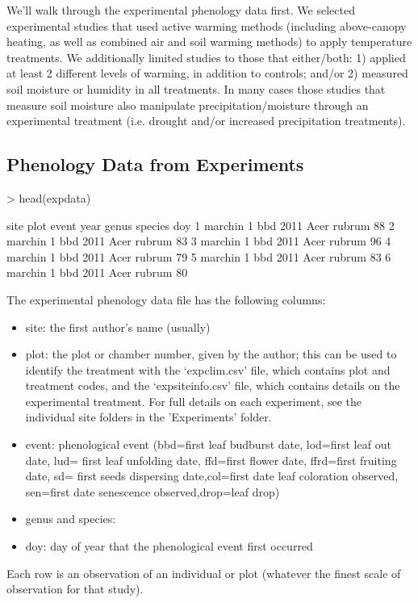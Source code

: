 \documentclass{article}
\begin{document}
We'll walk through the experimental phenology data first. We selected experimental studies that used active warming methods (including above-canopy heating, as well as combined air and soil warming methods) to apply temperature treatments. We additionally limited studies to those that either/both: 1) applied at least 2 different levels of warming, in addition to controls; and/or 2) measured soil moisture or humidity in all treatments. In many cases those studies that measure soil moisture also manipulate precipitation/moisture through an experimental treatment (i.e. drought and/or increased precipitation treatments).
\subsection{Phenology Data from Experiments}

\begin{Schunk}
\begin{Sinput}
> head(expdata)
\end{Sinput}
\begin{Soutput}
     site plot event year genus species doy
1 marchin    1   bbd 2011  Acer  rubrum  88
2 marchin    1   bbd 2011  Acer  rubrum  83
3 marchin    1   bbd 2011  Acer  rubrum  96
4 marchin    1   bbd 2011  Acer  rubrum  79
5 marchin    1   bbd 2011  Acer  rubrum  83
6 marchin    1   bbd 2011  Acer  rubrum  80
\end{Soutput}
\end{Schunk}
The experimental phenology data file has the following columns:
\begin{itemize}
  \item site: the first author's name (usually)
\item plot: the plot or chamber number, given by the author; this can be used to identify the treatment with the `expclim.csv' file, which contains plot and treatment codes, and the `expsiteinfo.csv' file, which contains details on the experimental treatment. For full details on each experiment, see the individual site folders in the 'Experiments' folder.
\item event: phenological event (bbd=first leaf budburst date, lod=first leaf out date, lud= first leaf unfolding date, ffd=first flower date, ffrd=first fruiting date, sd= first seeds dispersing date,col=first date leaf coloration observed, sen=first date senescence observed,drop=leaf drop)
\item genus and species: 
\item doy: day of year that the phenological event first occurred

\end{itemize}
Each row is an observation of an individual or plot (whatever the finest scale of observation for that study).
\end{document}
